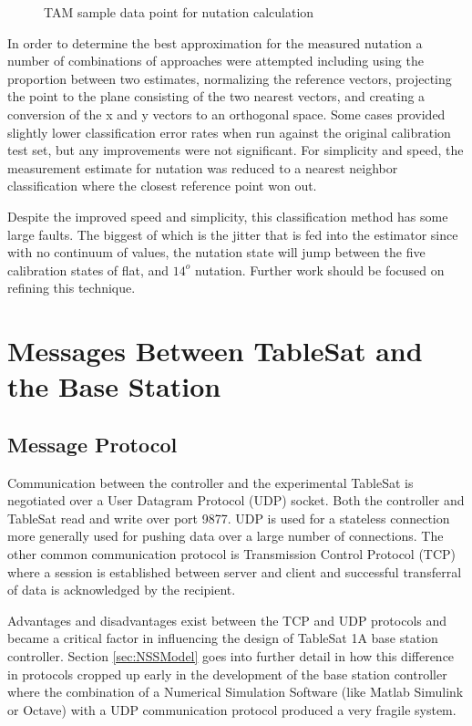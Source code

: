 \begin{figure}[H]
  \centerline{}
  \caption{TAM sample data point for nutation calculation}
  \label{fig:TAMPoint191}
\end{figure}

In order to determine the best approximation for the measured nutation a number of combinations of approaches were attempted including using the proportion between two estimates, normalizing the reference vectors, projecting the point to the plane consisting of the two nearest vectors, and creating a conversion of the x and y vectors to an orthogonal space.  Some cases provided slightly lower classification error rates when run against the original calibration test set, but any improvements were not significant.  For simplicity and speed, the measurement estimate for nutation was reduced to a nearest neighbor classification \cite{nearestneighbor} where the closest reference point won out.

Despite the improved speed and simplicity, this classification method has some large faults.  The biggest of which is the jitter that is fed into the estimator since with no continuum of values, the nutation state will jump between the five calibration states of flat, and $14^o$ nutation.  Further work should be focused on refining this technique.

\section{Messages Between TableSat and the Base Station}


\subsection{Message Protocol}
\label{subsec:UDPTCP}

Communication between the controller and the experimental TableSat is negotiated over a User Datagram Protocol (UDP) socket.  Both the controller and TableSat read and write over port 9877.  UDP is used for a stateless connection more generally used for pushing data over a large number of connections.  The other common communication protocol is Transmission Control Protocol (TCP) where a session is established between server and client and successful transferral of data is acknowledged by the recipient.

Advantages and disadvantages exist between the TCP and UDP protocols and became a critical factor in influencing the design of TableSat 1A base station controller. Section \ref{sec:NSSModel} goes into further detail in how this difference in protocols cropped up early in the development of the base station controller where the combination of a Numerical Simulation Software (like Matlab Simulink or Octave) with a UDP communication protocol produced a very fragile system.

